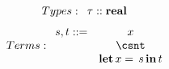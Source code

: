 \[
Types:
\begin{array}{c}
    \tau :: \mathbf{real}
\end{array}
\]
\[
Terms:
\begin{array}{cc}
    s,t::= 
    & \var \\
    & \csnt \\
    & \letin{\var}{s}{t}
\end{array}    
\]